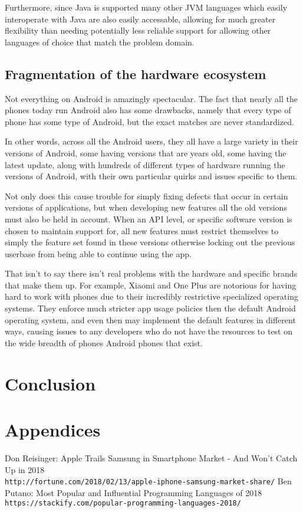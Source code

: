 \documentclass[12pt, letterpaper]{article}
\begin{document}
Furthermore, since Java is supported many other JVM languages which easily
interoperate with Java are also easily accessable, allowing for much greater
flexibility than needing potentially less reliable support for allowing
other languages of choice that match the problem domain.

\subsection{Fragmentation of the hardware ecosystem}
Not everything on Android is amazingly spectacular. The fact that nearly
all the phones today run Android also has some drawbacks, namely that
every type of phone has some type of Android, but the exact matches are
never standardized.

In other words, across all the Android users, they all have a large variety
in their versions of Android, some having versions that are years old,
some having the latest update, along with hundreds of different types of
hardware running the versions of Android, with their own particular quirks
and issues specific to them.

Not only does this cause trouble for simply fixing defects that occur in
certain versions of applications, but when developing new features all the
old versions must also be held in account. When an API level, or specific
software version is chosen to maintain support for, all new features must
restrict themselves to simply the feature set found in these versions
otherwise locking out the previous userbase from being able to continue
using the app.

That isn't to say there isn't real problems with the hardware and specific
brands that make them up. For example, Xiaomi and One Plus are notorious
for having hard to work with phones due to their incredibly restrictive
specialized operating systems. They enforce much stricter app usage policies
then the default Android operating system, and even then may implement the
default features in different ways, causing issues to any developers who
do not have the resources to test on the wide breadth of phones Android
phones that exist.

\section{Conclusion}



\section{Appendices}

\begin{thebibliography}{9}
Don Reisinger: Apple Trails Samsung in Smartphone Market - And Won't Catch Up in 2018
\\\texttt{http://fortune.com/2018/02/13/apple-iphone-samsung-market-share/}
Ben Putano: Most Popular and Influential Programming Languages of 2018
\\\texttt{https://stackify.com/popular-programming-languages-2018/}
\end{thebibliography}
\end{document}

